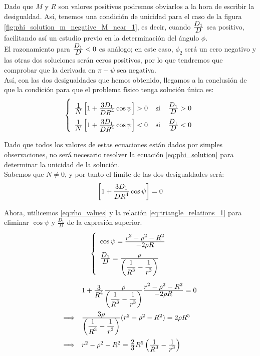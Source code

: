 Dado que $M$ y $R$ son valores positivos podremos obviarlos a la hora de escribir la desigualdad. Así, tenemos una condición de unicidad para el caso de la figura \ref{fig:phi_solution_m_negative_M_near_1}, es decir, cuando $\frac{\displaystyle D_1}{\displaystyle D}$ sea positivo, facilitando así un estudio previo en la determinación del ángulo $\phi$.\\

El razonamiento para $\frac{\displaystyle D_1}{\displaystyle D}<0$ es análogo; en este caso, $\phi_2$ será un cero negativo y las otras dos soluciones serán ceros positivos, por lo que tendremos que comprobar que la derivada en $\pi-\psi$ sea negativa.\\

Así, con las dos desigualdades que hemos obtenido, llegamos a la conclusión de que la condición para que el problema físico tenga solución única es:
\begin{align}
\left\{
\def\arraystretch{2}
\begin{array}{l}
	\ddfrac{1}{N}\left[1+\ddfrac{3D_1}{DR^4}\cos{\psi}\right]>0 \; \; \; \; \text{si} \; \; \; \; \ddfrac{D_1}{D}>0\\
	\ddfrac{1}{N}\left[1+\ddfrac{3D_1}{DR^4}\cos{\psi}\right]<0 \; \; \; \; \text{si} \; \; \; \; \ddfrac{D_1}{D}<0
\end{array}
\right.
\label{eq:condicion_unicidad}
\end{align}

Dado que todos los valores de estas ecuaciones están dados por simples observaciones, no será necesario resolver la ecuación \eqref{eq:phi_solution} para determinar la unicidad de la solución.\\

Sabemos que $N\neq0$, y por tanto el límite de las dos desigualdades será:
\[
\left[1+\frac{\displaystyle 3D_1}{\displaystyle DR^4}\cos{\psi}\right]=0
\]

Ahora, utilicemos \eqref{eq:rho_values} y la relación \eqref{eq:triangle_relations_1} para eliminar $\cos{\psi}$ y $\frac{D_1}{D}$ de la expresión superior.
\[
\left\{
\def\arraystretch{2}
\begin{array}{l}
	\cos{\psi}=\ddfrac{r^2-\rho^2-R^2}{-2\rho R}\\
	\ddfrac{D_1}{D}=\ddfrac{\rho}{\left(\ddfrac{1}{R^3}-\ddfrac{1}{r^3}\right)}
\end{array}
\right.
\]
\[
\def\arraystretch{2}
\begin{array}{ll}
& 1+\ddfrac{3}{R^4}\ddfrac{\rho}{\left(\ddfrac{1}{R^3}-\ddfrac{1}{r^3}\right)}\ddfrac{r^2-\rho^2-R^2}{-2\rho R}=0\\
\Longrightarrow & \ddfrac{3\rho}{\left(\ddfrac{1}{R^3}-\ddfrac{1}{r^3}\right)}(r^2-\rho^2-R^2)=2\rho R^5\\
\Longrightarrow & r^2-\rho^2-R^2=\ddfrac{2}{3}R^5\left(\ddfrac{1}{R^3}-\ddfrac{1}{r^3}\right)
\end{array}
\]

